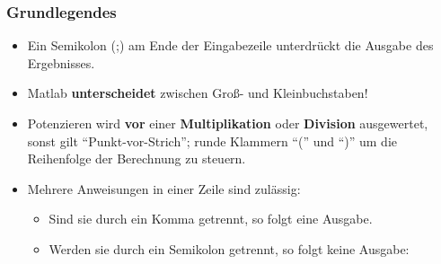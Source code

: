     \begin{frame}
      \frametitle{Grundlegendes}
      \begin{itemize}
        \item Ein Semikolon (;) am Ende der Eingabezeile unterdrückt die Ausgabe des Ergebnisses.
        \item Matlab \textbf{unterscheidet} zwischen Groß- und Kleinbuchstaben!
        \item Potenzieren wird \textbf{vor} einer \textbf{Multiplikation} oder \textbf{Division} ausgewertet, sonst gilt ``Punkt-vor-Strich''; runde Klammern ``('' und ``)'' um die Reihenfolge der Berechnung zu steuern.
        \item Mehrere Anweisungen in einer Zeile sind zulässig:

        \begin{itemize}
          \item Sind sie durch ein Komma getrennt, so folgt eine Ausgabe.
          \item Werden sie durch ein Semikolon getrennt, so folgt keine Ausgabe:

          \vspace{0.3cm}

          \begin{columns}[t]
            \begin{column}{5cm}
              \colorbox{bg}{}
            \end{column}

            \begin{column}{5cm}
              \colorbox{bg}{}
            \end{column}
          \end{columns}

        \end{itemize}
      \end{itemize}
    \end{frame}

